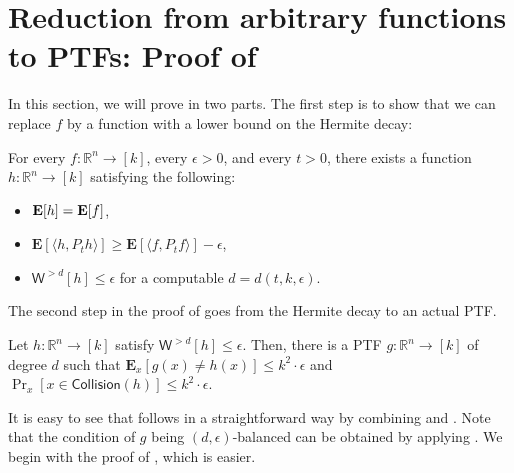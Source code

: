 \documentclass{toc}
\newcommand{\E}{{\bf E}}
\begin{document}
\section{Reduction from arbitrary functions to PTFs: Proof of }\label{sec:reduction}
In this section, we will prove  in two parts.
The first step is to show that
we can replace $f$ by a function with a lower bound on the Hermite decay:
\begin{lemma}\label{lem:1} 
  For every $f: \mathbb{R}^n \rightarrow [k]$, every $\epsilon>0$, and every $t > 0$, there exists a function
 $h: \mathbb{R}^n \rightarrow [k]$ satisfying the following: 
 \begin{itemize}
   \item $\E[h] = \E[f]$,
 \item $\mathbf{E}[\langle h, P_t h \rangle] \ge\mathbf{E}[ \langle f, P_t f \rangle ]- \epsilon$, 
 \item $\mathsf{W}^{> d} [h] \le \epsilon$ for a computable $d = d(t, k, \epsilon)$. 
 \end{itemize}
\end{lemma} 
The second step in the proof of  goes from the
Hermite decay to an actual PTF. 
\begin{lemma}\label{lem:2}
Let $h : \mathbb{R}^n \rightarrow [k]$ satisfy $\mathsf{W}^{>d}[h] \le \epsilon$. Then, there is a PTF $g: \mathbb{R}^n \rightarrow [k]$ of degree $d$ such that 
$ \mathbf{E}_{x } [g(x) \neq  h(x) ] \le k^2 \cdot  \epsilon$ and $\Pr_{x } [x \in \mathsf{Collision} (h)]  \le k^2 \cdot \epsilon$.
\end{lemma}
It is easy to see that  follows in a straightforward way by combining  and . 
Note that the condition of $g$ being $(d,\epsilon)$-balanced can be obtained by  applying .
We begin with the proof of , which is easier.
\end{document}
